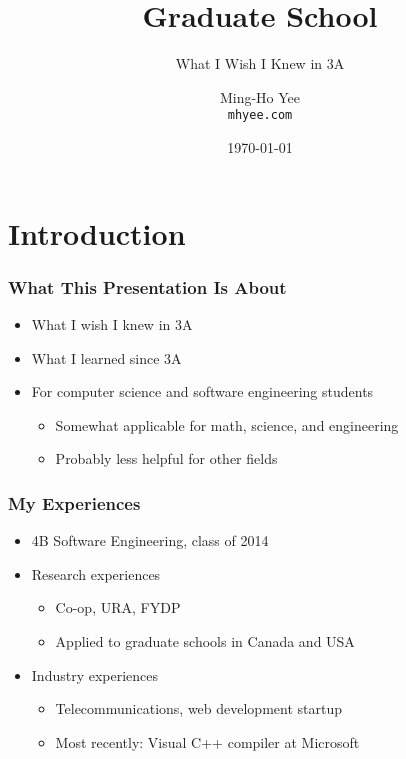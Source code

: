 \documentclass{beamer}
\title{Graduate School}
\subtitle{What I Wish I Knew in 3A}
\author[Ming-Ho Yee]{Ming-Ho Yee\\ \texttt{mhyee.com}}
\institute{University of Waterloo\\ Software Engineering 2014}
\date{\today}
\begin{document}
\maketitle


\section{Introduction}
\begin{frame}
  \frametitle{What This Presentation Is About}
  \begin{itemize}
      \item What I wish I knew in 3A
      \item What I learned since 3A
      \item For computer science and software engineering students
        \begin{itemize}
          \item Somewhat applicable for math, science, and engineering
          \item Probably less helpful for other fields
        \end{itemize}
  \end{itemize}
\end{frame}

\begin{frame}
  \frametitle{My Experiences}
  \begin{itemize}
      \item 4B Software Engineering, class of 2014
      \item Research experiences
        \begin{itemize}
            \item Co-op, URA, FYDP
            \item Applied to graduate schools in Canada and USA
        \end{itemize}
      \item Industry experiences
        \begin{itemize}
          \item Telecommunications, web development startup
          \item Most recently: Visual C++ compiler at Microsoft
        \end{itemize}
  \end{itemize}
\end{frame}
\end{document}
